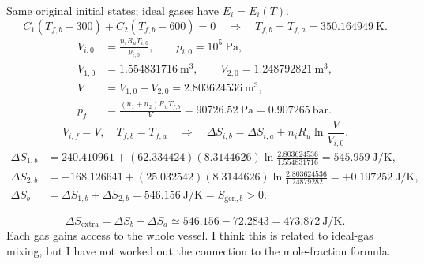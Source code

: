 Same original initial states; ideal gases have $E_i=E_i(T)$.
\[
C_1(T_{f,b}-300)+C_2(T_{f,b}-600)=0
\quad\Longrightarrow\quad
\boxed{T_{f,b}=T_{f,a}=350.164949~\mathrm{K}}.
\]
\begin{align*}
V_{i,0}&=\frac{n_iR_uT_{i,0}}{p_{i,0}},\qquad p_{i,0}=10^5~\mathrm{Pa},\\
V_{1,0}&=1.554831716~\mathrm{m^3},\qquad
V_{2,0}=1.248792821~\mathrm{m^3},\\
V&=V_{1,0}+V_{2,0}=2.803624536~\mathrm{m^3},\\
p_f&=\frac{(n_1+n_2)R_uT_{f,b}}{V}
=90726.52~\mathrm{Pa}
=\boxed{0.907265~\mathrm{bar}}.
\end{align*}
\[
V_{i,f}=V,\quad T_{f,b}=T_{f,a}
\quad\Longrightarrow\quad
\Delta S_{i,b}=\Delta S_{i,a}+n_iR_u\ln\frac{V}{V_{i,0}}.
\]
\begin{align*}
\Delta S_{1,b}
&=240.410961+(62.334424)(8.3144626)\ln\frac{2.803624536}{1.554831716}
=\boxed{545.959~\mathrm{J/K}},\\
\Delta S_{2,b}
&=-168.126641+(25.032542)(8.3144626)\ln\frac{2.803624536}{1.248792821}
=\boxed{+0.197252~\mathrm{J/K}},\\
\Delta S_b&=\Delta S_{1,b}+\Delta S_{2,b}
=\boxed{546.156~\mathrm{J/K}}=S_{\mathrm{gen},b}>0.
\end{align*}

\[
\Delta S_{\mathrm{extra}}=\Delta S_b-\Delta S_a
\simeq 546.156-72.2843
=\boxed{473.872~\mathrm{J/K}}.
\]
Each gas gains access to the whole vessel. I think this is related to ideal-gas
mixing, but I have not worked out the connection to the mole-fraction formula.
